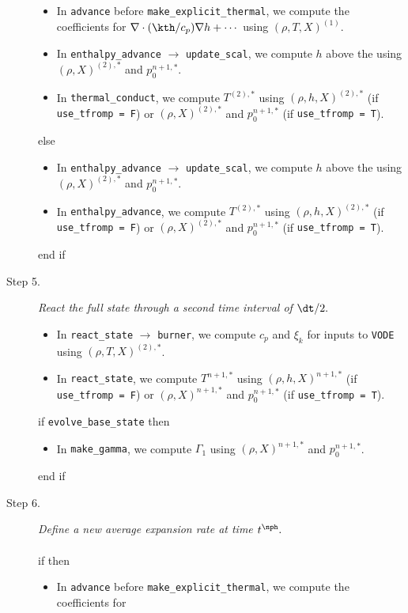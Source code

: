 \begin{description}
\begin{itemize}
\item In {\tt advance} before {\tt make\_explicit\_thermal}, we compute the coefficients for 
$\nabla\cdot(\kth/c_p)\nabla h + \cdots$ using $(\rho,T,X)^{(1)}$.
\item In {\tt enthalpy\_advance} $\rightarrow$ {\tt update\_scal}, we compute $h$ above
the  using $(\rho,X)^{(2),*}$ and $p_0^{n+1,*}$.
\item In {\tt thermal\_conduct}, we compute $T^{(2),*}$ using $(\rho,h,X)^{(2),*}$
(if {\tt use\_tfromp = F}) or $(\rho,X)^{(2),*}$ and $p_0^{n+1,*}$ (if {\tt use\_tfromp = T}).
\end{itemize}
else
\begin{itemize}
\item In {\tt enthalpy\_advance} $\rightarrow$ {\tt update\_scal}, we compute $h$ above
the  using $(\rho,X)^{(2),*}$ and $p_0^{n+1,*}$.
\item In {\tt enthalpy\_advance}, we compute $T^{(2),*}$ using $(\rho,h,X)^{(2),*}$
(if {\tt use\_tfromp = F}) or $(\rho,X)^{(2),*}$ and $p_0^{n+1,*}$ (if {\tt use\_tfromp = T}).
\end{itemize}
end if
\item[Step 5.] {\em React the full state through a second time interval of $\dt/2.$}
\begin{itemize}
\item In {\tt react\_state} $\rightarrow$ {\tt burner}, we compute $c_p$ and $\xi_k$ 
for inputs to {\tt VODE} using $(\rho,T,X)^{(2),*}$.
\item In {\tt react\_state}, we compute $T^{n+1,*}$ using $(\rho,h,X)^{n+1,*}$ 
(if {\tt use\_tfromp = F}) or $(\rho,X)^{n+1,*}$ and $p_0^{n+1,*}$ (if {\tt use\_tfromp = T}).
\end{itemize}
if {\tt evolve\_base\_state} then
\begin{itemize}
\item In {\tt make\_gamma}, we compute $\Gamma_1$ using $(\rho,X)^{n+1,*}$ and $p_0^{n+1,*}$.
\end{itemize}
end if
\item[Step 6.] {\em Define a new average expansion rate at time $t^\nph.$}\\ \\
if  then
\begin{itemize}
\item In {\tt advance} before {\tt make\_explicit\_thermal}, we compute the coefficients for 

\end{itemize}
\end{description}

